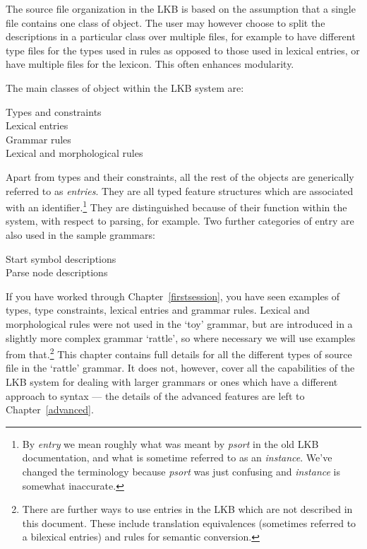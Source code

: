 \documentclass[12pt]{report}
\newcommand{\newterm}[1]{{\it #1}}
\begin{document}
The source file organization in the LKB is based on the assumption that
a single file contains one class of object.  The user may however 
choose to split
the descriptions in a particular class over multiple files, for example to have
different type files for the types used in rules as opposed to those used
in lexical entries, or have multiple files for the lexicon.
This often enhances modularity.

The main classes of object within the LKB system 
are:
\begin{description}
\item[Types and constraints]
\item[Lexical entries]
\item[Grammar rules]
\item[Lexical and morphological rules]
\end{description}
Apart from types and
their constraints, all the rest of the objects are generically referred to
as \newterm{entries}.
They are all typed feature structures which are associated 
with an identifier.\footnote{By \newterm{entry} we mean roughly
what was meant by \newterm{psort} in the old LKB documentation,
and what is sometime referred to as an \newterm{instance}.  
We've changed the terminology because \newterm{psort}
was just confusing and \newterm{instance} is somewhat inaccurate.}
They are distinguished because of their 
function within the system, with respect to
parsing, for example.
Two further categories of entry are also used in the sample
grammars:
\begin{description}
\item[Start symbol descriptions]
\item[Parse node descriptions]
\end{description}

If you have worked through Chapter~\ref{firstsession}, you have seen
examples of types, type constraints, lexical entries and grammar rules.
Lexical and morphological rules were not used in the `toy' grammar,
but are introduced in a slightly more complex grammar
`rattle', so where necessary we will use examples from 
that.\footnote{There are further ways to use entries in the LKB which are
not described in this document.  These include 
translation equivalences (sometimes referred to
a bilexical entries) and rules for semantic conversion.}
This chapter contains full details for all the different
types of source file in the `rattle' grammar.
It does not, however, cover all the capabilities of the LKB system
for dealing with larger grammars or ones which have a different
approach to syntax --- the details of the advanced features
are left to Chapter~\ref{advanced}.
\end{document}
